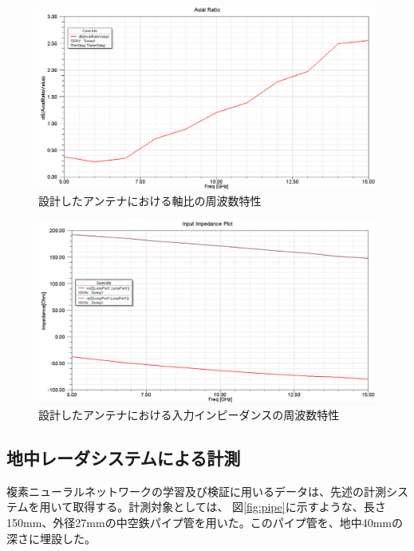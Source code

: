 \documentclass[11pt,a4paper,uplatex]{ujarticle}
\begin{document}
  \begin{figure}[hbtp]
    \centering
    \includegraphics[keepaspectratio, width=130mm]{Images/axial_ratio.png}
    \caption{設計したアンテナにおける軸比の周波数特性}
    \label{fig:axial_ratio}
  \end{figure}

  \clearpage

  \begin{figure}[hbtp]
    \centering
    \includegraphics[keepaspectratio, width=130mm]{Images/spiral_impedance.png}
    \caption{設計したアンテナにおける入力インピーダンスの周波数特性}
    \label{fig:spiral_antenna_impedance}
  \end{figure}

\newpage

  \subsection{地中レーダシステムによる計測}
  複素ニューラルネットワークの学習及び検証に用いるデータは、先述の計測システムを用いて取得する。計測対象としては、
  図\ref{fig:pipe}に示すような、長さ150mm、外径27mmの中空鉄パイプ管を用いた。このパイプ管を、地中40mmの深さに埋設した。
\end{document}
